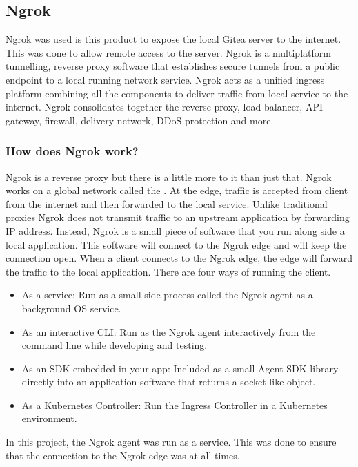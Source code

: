 \subsection{Ngrok}
\label{sec:ngrok}
Ngrok was used is this product to expose the local Gitea server to the internet. This was done to allow remote access to the server.
Ngrok is a multiplatform tunnelling, reverse proxy software that establishes secure tunnels from a public endpoint to a local running network service.
Ngrok acts as a unified ingress platform combining all the components to deliver traffic from local service to the internet. 
Ngrok consolidates together the reverse proxy, load balancer, \ac{API} gateway, firewall, delivery network, DDoS protection and more.\cite{ngrok}

\subsubsection{How does Ngrok work?}
Ngrok is a reverse proxy but there is a little more to it than just that. Ngrok 
works on a global network called the . At the edge, traffic is accepted from client from the internet 
and then forwarded to the local service.
Unlike traditional proxies Ngrok does not transmit traffic to an upstream application by forwarding IP address. Instead, 
Ngrok is a small piece of software that you run along side a local application. This software will connect to 
the Ngrok edge and will keep the connection open. When a client connects to the Ngrok edge, the edge will forward the
traffic to the local application.
There are four ways of running the client\cite{ngrok-works}.

\begin{itemize}
    \item As a service: Run as a small side process called the Ngrok agent as a
    background \ac{OS} service.
    \item As an interactive \ac{CLI}: Run as the Ngrok agent
    interactively from the command line while developing and testing.
    \item As an \ac{SDK}
    embedded in your app: Included as a small Agent \ac{SDK} library directly into an
    application software that returns a socket-like object. 
    \item As a Kubernetes
    Controller: Run the Ingress Controller in a Kubernetes environment.
\end{itemize}

In this project, the Ngrok agent was run as a service. This was done to ensure that the connection to the Ngrok edge was at all times.